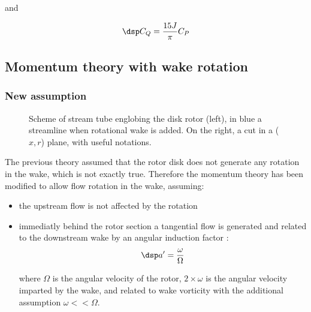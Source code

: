 and 


$$\dsp
C_Q = \frac{15 J}{\pi} C_P
$$


 


\subsection{Momentum theory with wake rotation}



\subsubsection{\sc New assumption}

\begin{figure}[h]
  \begin{center}
  
  \caption{Scheme of stream tube englobing the disk rotor (left), 
  in blue a streamline when rotational wake is added. On the right,
  a cut in a ($x, r$) plane, with useful notations.}
  \label{fig:disk_rotor_scheme}
  \end{center}
\end{figure}

The previous theory assumed that the rotor disk does not generate any rotation in the wake, which is not exactly true.
Therefore the momentum theory has been modified to allow flow rotation in the wake, assuming:

\begin{itemize}
  \item the upstream flow is not affected by the rotation
  \item immediatly behind the rotor section a tangential flow is generated and related to the
    downstream wake by an angular induction factor :
    \begin{equation} \dsp
      a' = \frac{\omega}{\Omega}
    \label{eq:ap0}
    \end{equation} 

    where $\Omega$ is the angular velocity of the rotor, $2 \times \omega$ 
    is the angular velocity imparted by the wake, and related to 
    wake vorticity with the additional assumption $\omega << \Omega$.
\end{itemize}

